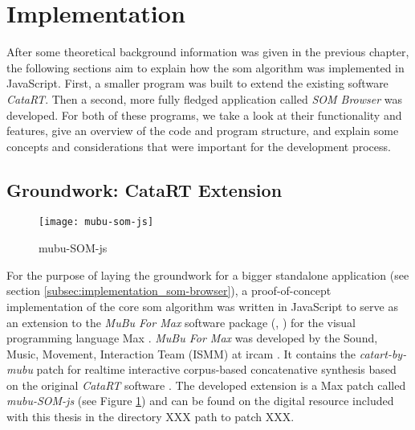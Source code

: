 
\section{Implementation}
\label{sec:implementation}
After some theoretical background information was given in the previous chapter,
the following sections aim to explain how the \gls{som} algorithm was
implemented in JavaScript. First, a smaller program was built to extend the
existing software \textit{CataRT}. Then a second, more fully
fledged application called \textit{SOM Browser} was developed. For both of
these programs, we take a look at their functionality and features, give an
overview of the code and program structure, and explain some concepts and
considerations that were important for the development process.

\subsection{Groundwork: CataRT Extension}

\begin{figure}[!htb]
  \centering
  \texttt{[image: mubu-som-js]}
  \caption{mubu-SOM-js}
  \label{fig:mubu-som}
\end{figure}

\label{subsec:implementation_catart}
For the purpose of laying the groundwork for a bigger standalone application
(see section \ref{subsec:implementation_som-browser}), a proof-of-concept
implementation of the core \gls{som} algorithm was written in JavaScript to
serve as an extension to the \textit{MuBu For Max} software package
(\citet{web:mubu2019}, \citet{web:mubu2019_2}) for the visual programming
language Max \citep{web:max2019}. \textit{MuBu For Max} was developed by the
Sound, Music, Movement, Interaction Team (ISMM) at \gls{ircam}
\citep{schnell2009}. It contains the \textit{catart-by-mubu} patch for
realtime interactive corpus-based concatenative synthesis based on the original
\textit{CataRT} software \citep{schwarz2006}. The developed extension is a Max
patch called \textit{mubu-SOM-js} (see Figure \ref{fig:mubu-som}) and can be
found on the digital resource included with this thesis in the directory
XXX path to patch XXX.

\smallskip

